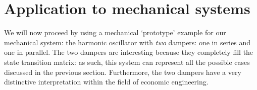 \section{Application to mechanical systems}
We will now proceed by using a mechanical `prototype' example for our mechanical system: the harmonic oscillator with \emph{two} dampers: one in series and one in parallel. The two dampers are interesting because they completely fill the state transition matrix: as such, this system can represent all the possible cases discussed in the previous section. Furthermore, the two dampers have a very distinctive interpretation within the field of economic engineering.
%    

